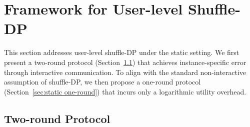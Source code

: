 



\section{Framework for User-level Shuffle-DP}


This section addresses user-level shuffle-DP under the static setting.
We first present a two-round protocol (Section~\ref{sec: static two-round}) that achieves instance-specific error through interactive communication.
To align with the standard non-interactive assumption of shuffle-DP, we then propose a one-round protocol (Section~\ref{sec:static one-round}) that incurs only a logarithmic utility overhead.





\subsection{Two-round Protocol}
\label{sec: static two-round}




